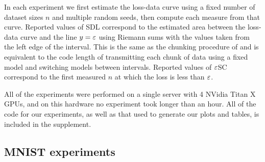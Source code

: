 

 \label{sec:experiment_details}

In each experiment we first estimate the loss-data curve using a fixed number of dataset sizes $n$ and multiple random seeds, then compute each measure from that curve.
Reported values of SDL correspond to the estimated area between the loss-data curve and the line $y=\varepsilon$ using Riemann sums with the values taken from the left edge of the interval.
This is the same as the chunking procedure of \citet{Voita2020InformationTheoreticPW} and is equivalent to the code length of transmitting each chunk of data using a fixed model and switching models between intervals.
Reported values of $\varepsilon$SC correspond to the first measured $n$ at which the loss is less than $\varepsilon$.

All of the experiments were performed on a single server with 4 NVidia Titan X GPUs, and on this hardware no experiment took longer than an hour.
All of the code for our experiments, as well as that used to generate our plots and tables, is included in the supplement.


\subsection{MNIST experiments}


